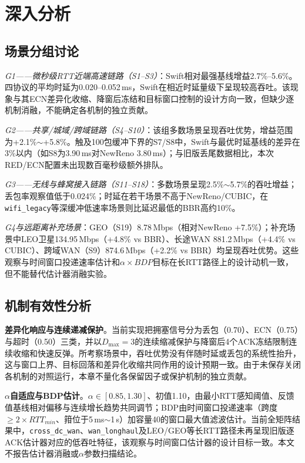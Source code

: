 \section{深入分析}

\subsection{场景分组讨论}

\textit{G1——微秒级RTT近端高速链路（S1--S3）}：Swift相对最强基线增益2.7\%--5.6\%。四协议的平均时延为0.020--0.052\,ms，Swift在相近时延量级下呈现较高吞吐。该现象与其ECN差异化收缩、降窗后冻结和目标窗口控制的设计方向一致，但缺少逐机制消融，不能确定各机制的独立贡献。

\textit{G2——共享/城域/跨域链路（S4--S10）}：该组多数场景呈现吞吐优势，增益范围为+2.1\%$\sim$+5.8\%。触及100包缓冲下界的S7/S8中，Swift与最优时延基线的差异在3\%以内（如S8为3.90\,ms对NewReno 3.80\,ms）；与旧版丢尾数据相比，本次RED/ECN配置未出现数百毫秒级额外排队。

\textit{G3——无线与蜂窝接入链路（S11--S18）}：多数场景呈现2.5\%$\sim$5.7\%的吞吐增益；丢包率观察值低于0.024\%；时延在若干场景不高于NewReno/CUBIC，在\texttt{wifi\_legacy}等深缓冲低速率场景则比延迟最低的BBR高约10\%。

\textit{G4与远距离补充场景}：GEO（S19）8.78\,Mbps（相对NewReno +7.5\%）；补充场景中LEO卫星134.95\,Mbps（+4.8\% vs BBR）、长途WAN 881.2\,Mbps（+4.4\% vs CUBIC）、跨域WAN（S9）874.6\,Mbps（+2.2\% vs BBR）均呈现吞吐优势。这些观察与时间窗口投递速率估计和$\alpha \times BDP$目标在长RTT路径上的设计动机一致，但不能替代估计器消融实验。

\subsection{机制有效性分析}

\textbf{差异化响应与连续递减保护}。当前实现把拥塞信号分为丢包（0.70）、ECN（0.75）与超时（0.50）三类，并以$D_{\max}=3$的连续缩减保护与降窗后4个ACK冻结限制连续收缩和快速反弹。所考察场景中，吞吐优势没有伴随时延或丢包的系统性抬升，这与窗口上界、目标回落和差异化收缩共同作用的设计预期一致。由于未保存关闭各机制的对照运行，本章不量化各保留因子或保护机制的独立贡献。

\textbf{$\alpha$自适应与BDP估计}。$\alpha \in [0.85,1.30]$、初值1.10，由最小RTT感知阈值、反馈值基线相对偏移与连续增长趋势共同调节；BDP由时间窗口投递速率（跨度$\ge 2\times RTT_{min}$、箝位于5\,ms$\sim$1\,s）加容量40的窗口最大值滤波估计。当前全矩阵结果中，\texttt{cross\_dc\_wan}、\texttt{wan\_longhaul}及LEO/GEO等长RTT路径未再呈现旧版逐ACK估计器对应的低吞吐特征，该观察与时间窗口估计器的设计目标一致。本文不报告估计器消融或$\alpha$参数扫描结论。

